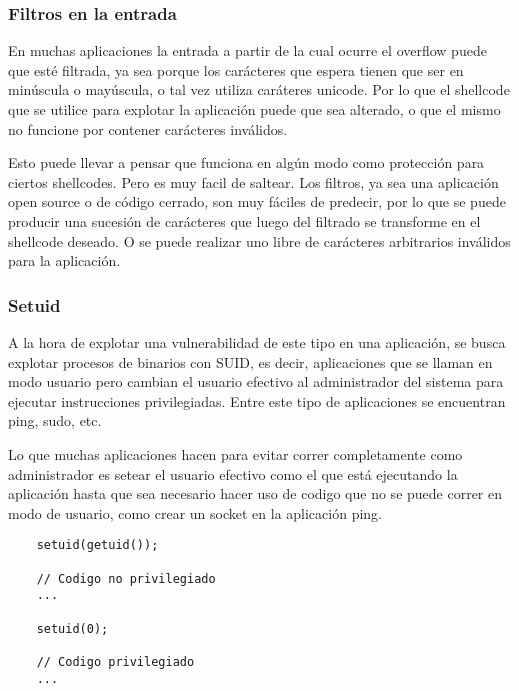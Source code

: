 	\subsubsection{Filtros en la entrada}
		\label{sec:filtros}
	
	En muchas aplicaciones la entrada a partir de la cual ocurre el overflow puede que est\'e filtrada, ya sea porque los car\'acteres que espera tienen que ser en min\'uscula o may\'uscula, o tal vez utiliza car\'ateres unicode. Por lo que el shellcode que se utilice para explotar la aplicaci\'on puede que sea alterado, o que el mismo no funcione por contener car\'acteres inv\'alidos.
	
	Esto puede llevar a pensar que funciona en alg\'un modo como protecci\'on para ciertos shellcodes. Pero es muy facil de saltear. Los filtros, ya sea una aplicaci\'on open source o de c\'odigo cerrado, son muy f\'aciles de predecir, por lo que se puede producir una sucesi\'on de car\'acteres que luego del filtrado se transforme en el shellcode deseado. O se puede realizar uno libre de car\'acteres arbitrarios inv\'alidos para la aplicaci\'on.
	
	\subsubsection{Setuid}
		\label{sec:setuid}
	
	A la hora de explotar una vulnerabilidad de este tipo en una aplicaci\'on, se busca explotar procesos de binarios con SUID, es decir, aplicaciones que se llaman en modo usuario pero cambian el usuario efectivo al administrador del sistema para ejecutar instrucciones privilegiadas. Entre este tipo de aplicaciones se encuentran ping, sudo, etc.
	
	Lo que muchas aplicaciones hacen para evitar correr completamente como administrador es setear el usuario efectivo como el que est\'a ejecutando la aplicaci\'on hasta que sea necesario hacer uso de codigo que no se puede correr en modo de usuario, como crear un socket en la aplicaci\'on ping.
	
	\vspace{5 mm}
	
	\begin{lstlisting}
	setuid(getuid());
	
	// Codigo no privilegiado
	...
	
	setuid(0);
	
	// Codigo privilegiado
	...
	\end{lstlisting}
	
